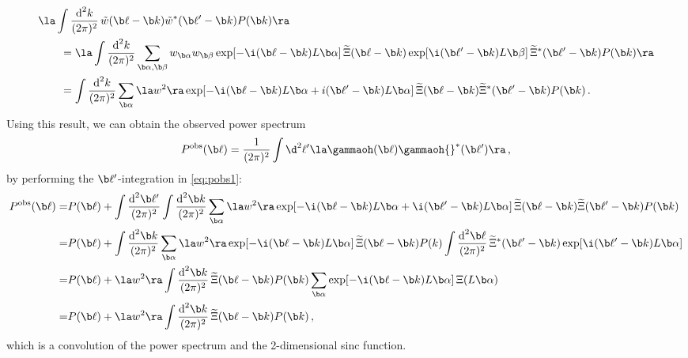 \begin{align}
&\la \int \frac{\text{d}^2 k}{(2\pi)^2}\, \tilde{w}(\b \ell-\b k)\tilde{w}^*(\b \ell'-\b k)P(\b k)\ra \nonumber\\
&\qquad = \la \int \frac{\text{d}^2 k}{(2\pi)^2} \sum_{\b \alpha,\b \beta}w_{\b \alpha}w_{\b \beta} \exp[-\i(\b \ell - \b k)L\b \alpha]\, \widetilde{\Xi}(\b \ell - \b k) \exp[\i(\b \ell' - \b k)L\b \beta]\, \widetilde{\Xi}^*(\b \ell' - \b k)P(\b k)\ra \nonumber\\
&\qquad = \int \frac{\text{d}^2 k}{(2\pi)^2} \sum_{\b \alpha} \la w^2\ra \exp[-\i(\b \ell - \b k)L\b \alpha + i(\b \ell' - \b k) L\b \alpha]\, \widetilde{\Xi}(\b \ell - \b k)\widetilde{\Xi}^*(\b \ell' - \b k)P(\b k) \, .
\end{align}
Using this result, we can obtain the observed power spectrum \begin{equation}
P^{\rm{obs}}(\b\ell) = \frac{1}{(2\pi)^2}\int\d^2\ell' \la \gammaoh(\b \ell) \gammaoh {}^*(\b \ell')\ra\, ,
\end{equation}
by performing the $\b \ell'$-integration in \eqref{eq:pobs1}:
\begin{align}
P^{\text{obs}}(\b \ell) = & P(\b \ell)+\int \frac{\text{d}^2\b \ell'}{(2\pi)^2} \int\frac{\text{d}^2\b k}{(2\pi)^2}\sum_{\b \alpha}\la w^2\ra \exp[-\i(\b \ell-\b k)L\b \alpha+\i(\b \ell'-\b k)L\b \alpha]\, \widetilde{\Xi}(\b \ell-\b k)\widetilde{\Xi}(\b \ell' - \b k) P(\b k) \nonumber\\
= & P(\b \ell)+ \int\frac{\text{d}^2\b k}{(2\pi)^2}\sum_{\b \alpha}\la w^2\ra \exp[-\i(\b \ell-\b k)L\b \alpha]\, \widetilde{\Xi}(\b \ell - \b k)P(k) \int\frac{\text{d}^2\b \ell}{(2\pi)^2}\, \widetilde{\Xi}^*(\b \ell'-\b k)\exp[\i(\b \ell'- \b k)L\b \alpha] \nonumber\\
 = & P(\b \ell) + \la w^2\ra \int\frac{\text{d}^2\b k}{(2\pi)^2}\, \widetilde{\Xi}(\b \ell-\b k)P(\b k) \sum_{\b \alpha}\exp[-\i(\b \ell - \b k)L\b \alpha]\,\Xi(L\b \alpha) \nonumber\\
 = & P(\b \ell) + \la w^2\ra \int\frac{\text{d}^2\b k}{(2\pi)^2}\,\widetilde{\Xi}(\b \ell-\b k)P(\b k)\, ,
\end{align}
which is a convolution of the power spectrum and the 2-dimensional sinc function.
\label{sec:calc of PS}

